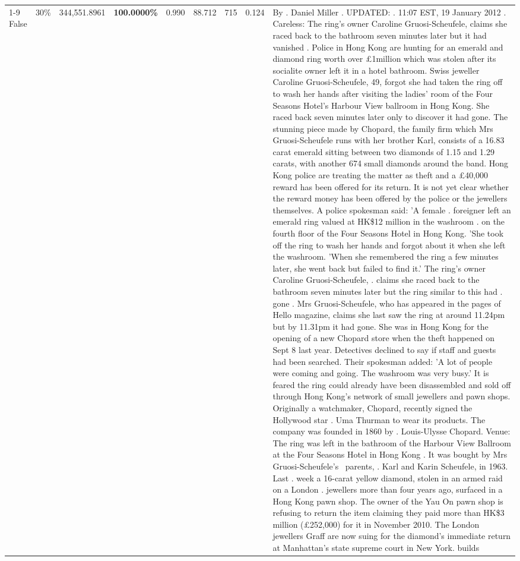 \begin{table}[H]
\begin{tabular}{lllrlllll}
\cline{1-9} \cline{2-9}
False & 30\% & 344,551.8961 & \bfseries \color{red} 100.0000\% & 0.990 & 88.712 & 715 & 0.124 & By . Daniel Miller . UPDATED: . 11:07 EST, 19 January 2012 . Careless: The ring's owner Caroline Gruosi-Scheufele, claims she raced back to the bathroom seven minutes later but it had vanished . Police in Hong Kong are hunting for an emerald and diamond ring worth over £1million which was stolen after its socialite owner left it in a hotel bathroom. Swiss jeweller Caroline Gruosi-Scheufele, 49, forgot she had taken the ring off to wash her hands after visiting the ladies' room of the Four Seasons Hotel's Harbour View ballroom in Hong Kong. She raced back seven minutes later only to discover it had gone. The stunning piece made by Chopard, the family firm which Mrs Gruosi-Scheufele runs with her brother Karl, consists of a 16.83 carat emerald sitting between two diamonds of 1.15 and 1.29 carats, with another 674 small diamonds around the band. Hong Kong police are treating the matter as theft and a £40,000 reward has been offered for its return. It is not yet clear whether the reward money has been offered by the police or the jewellers themselves. A police spokesman said: 'A female . foreigner left an emerald ring valued at HK\$12 million in the washroom . on the fourth floor of the Four Seasons Hotel in Hong Kong. 'She took off the ring to wash her hands and forgot about it when she left the washroom. 'When she remembered the ring a few minutes later, she went back but failed to find it.' The ring's owner Caroline Gruosi-Scheufele, . claims she raced back to the bathroom seven minutes later but the ring similar to this had . gone . Mrs Gruosi-Scheufele, who has appeared in the pages of Hello magazine, claims she last saw the ring at around 11.24pm but by 11.31pm it had gone. She was in Hong Kong for the opening of a new Chopard store when the theft happened on Sept 8 last year. Detectives declined to say if staff and guests had been searched. Their spokesman added: 'A lot of people were coming and going. The washroom was very busy.' It is feared the ring could already have been disassembled and sold off through Hong Kong's network of small jewellers and pawn shops. Originally a watchmaker, Chopard, recently signed the Hollywood star . Uma Thurman to wear its products. The company was founded in 1860 by . Louis-Ulysse Chopard. Venue: The ring was left in the bathroom of the Harbour View Ballroom at the Four Seasons Hotel in Hong Kong . It was bought by Mrs Gruosi-Scheufele's  parents, . Karl and Karin Scheufele, in 1963. Last . week a 16-carat yellow diamond, stolen in an armed raid on a London . jewellers more than four years ago, surfaced in a Hong Kong pawn shop. The owner of the Yau On pawn shop is refusing to return the item claiming they paid more than HK\$3 million (£252,000) for it in November 2010. The London jewellers Graff are now suing for the diamond’s immediate return at Manhattan’s state supreme court in New York. builds \\

\end{tabular}
\end{table}
